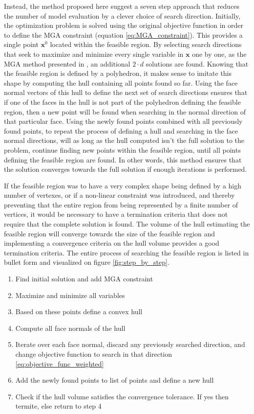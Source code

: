 Instead, the method proposed here suggest a seven step approach that reduces the number of model evaluation by a clever choice of search direction. Initially, the optimization problem is solved using the original objective function in order to define the MGA constraint (equation \ref{eq:MGA_constraint}). This provides a single point $\mathbf{x}^0$ located within the feasible region. By selecting search directions that seek to maximize and minimize every single variable in $\mathbf{x}$ one by one, as the MGA method presented in \cite{Fabian_MGA}, an additional $2\cdot d$ solutions are found. Knowing that the feasible region is defined by a polyhedron, it makes sense to imitate this shape by computing the hull containing all points found so far. Using the face normal vectors of this hull to define the next set of search directions ensures that if one of the faces in the hull is not part of the polyhedron defining the feasible region, then a new point will be found when searching in the normal direction of that particular face. Using the  newly found points combined with all previously found points, to repeat the process of defining a hull and searching in the face normal directions, will as long as the hull computed isn't the full solution to the problem, continue finding new points within the feasible region, until all points defining the feasible region are found. In other words, this method ensures that the solution converges towards the full solution if enough iterations is performed. 

If the feasible region was to have a very complex shape being defined by a high number of vertexes, or if a non-linear constraint was introduced, and thereby preventing that the entire region from being represented by a finite number of vertices, it would be necessary to have a termination criteria that does not require that the complete solution is found. The volume of the hull estimating the feasible region will converge towards the size of the feasible region and implementing a convergence criteria on the hull volume provides a good termination criteria. The entire process of searching the feasible region is listed in bullet form and visualized on figure \ref{fig:step_by_step}.


\begin{enumerate}
	\item Find initial solution and add MGA constraint 
	\item Maximize and minimize all variables
	\item Based on these points define a convex hull 
	\item Compute all face normals of the hull
	\item Iterate over each face normal, discard any previously searched direction, and change objective function to search in that direction \vref{eq:objective_func_weighted}
	\item Add the newly found points to list of points and define a new hull
	\item Check if the hull volume satisfies the convergence tolerance. If yes then termite, else return to step 4 
\end{enumerate}

